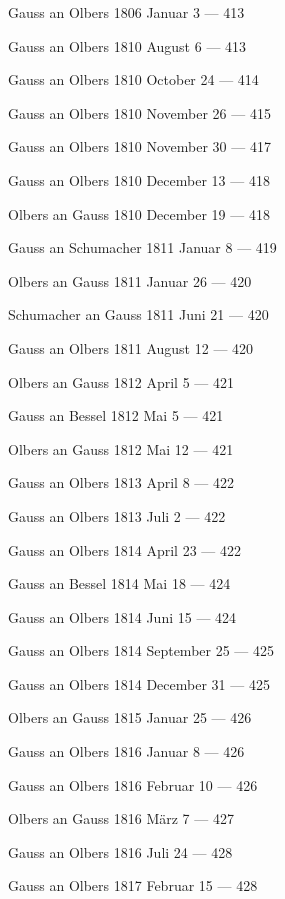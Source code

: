 \documentclass[10pt,a4paper]{article}
\newenvironment{hangparas}[2]{\setlength{\hangindent}{#1}\setlength{\hangafter}{#2}}{}
\begin{document}
\begin{hangparas}{1em}{1}
\noindent Gauss an Olbers 1806 Januar 3 \hfill --- 413

\noindent Gauss an Olbers 1810 August 6 \hfill --- 413

\noindent Gauss an Olbers 1810 October 24 \hfill --- 414

\noindent Gauss an Olbers 1810 November 26 \hfill --- 415

\noindent Gauss an Olbers 1810 November 30 \hfill --- 417

\noindent Gauss an Olbers 1810 December 13 \hfill --- 418

\noindent Olbers an Gauss 1810 December 19 \hfill --- 418

\noindent Gauss an Schumacher 1811 Januar 8 \hfill --- 419

\noindent Olbers an Gauss 1811 Januar 26 \hfill --- 420

\noindent Schumacher an Gauss 1811 Juni 21 \hfill --- 420

\noindent Gauss an Olbers 1811 August 12 \hfill --- 420

\noindent Olbers an Gauss 1812 April 5 \hfill --- 421

\noindent Gauss an Bessel 1812 Mai 5 \hfill --- 421

\noindent Olbers an Gauss 1812 Mai 12 \hfill --- 421

\noindent Gauss an Olbers 1813 April 8 \hfill --- 422

\noindent Gauss an Olbers 1813 Juli 2 \hfill --- 422

\noindent Gauss an Olbers 1814 April 23 \hfill --- 422

\noindent Gauss an Bessel 1814 Mai 18 \hfill --- 424

\noindent Gauss an Olbers 1814 Juni 15 \hfill --- 424

\noindent Gauss an Olbers 1814 September 25 \hfill --- 425

\noindent Gauss an Olbers 1814 December 31 \hfill --- 425

\noindent Olbers an Gauss 1815 Januar 25 \hfill --- 426

\noindent Gauss an Olbers 1816 Januar 8 \hfill --- 426

\noindent Gauss an Olbers 1816 Februar 10 \hfill --- 426

\noindent Olbers an Gauss 1816 März 7 \hfill --- 427

\noindent Gauss an Olbers 1816 Juli 24 \hfill --- 428

\noindent Gauss an Olbers 1817 Februar 15 \hfill --- 428


\end{hangparas}
\end{document}
